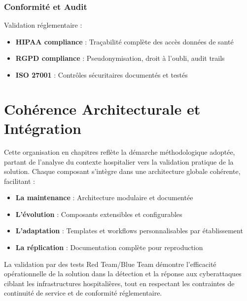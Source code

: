 \subsubsection{Conformité et Audit}
Validation réglementaire :
\begin{itemize}
    \item \textbf{HIPAA compliance} : Traçabilité complète des accès données de santé
    \item \textbf{RGPD compliance} : Pseudonymisation, droit à l'oubli, audit trails
    \item \textbf{ISO 27001} : Contrôles sécuritaires documentés et testés
\end{itemize}

\section{Cohérence Architecturale et Intégration}

Cette organisation en chapitres reflète la démarche méthodologique adoptée, partant de l'analyse du contexte hospitalier vers la validation pratique de la solution. Chaque composant s'intègre dans une architecture globale cohérente, facilitant :

\begin{itemize}
    \item \textbf{La maintenance} : Architecture modulaire et documentée
    \item \textbf{L'évolution} : Composants extensibles et configurables
    \item \textbf{L'adaptation} : Templates et workflows personnalisables par établissement
    \item \textbf{La réplication} : Documentation complète pour reproduction
\end{itemize}

La validation par des tests Red Team/Blue Team démontre l'efficacité opérationnelle de la solution dans la détection et la réponse aux cyberattaques ciblant les infrastructures hospitalières, tout en respectant les contraintes de continuité de service et de conformité réglementaire.

\newpage
